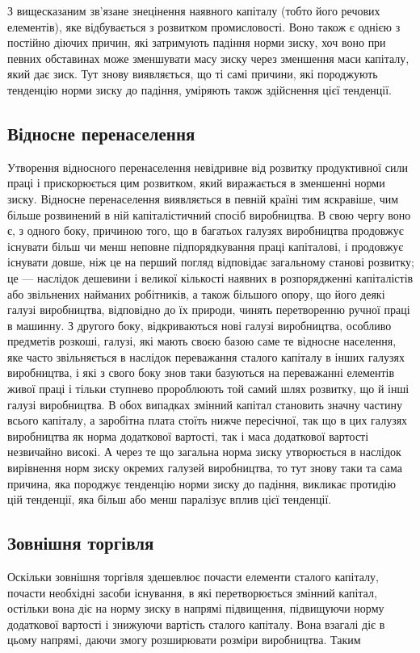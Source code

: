 
З вищесказаним зв’язане знецінення наявного капіталу (тобто його речових елементів), яке
відбувається з розвитком промисловості. Воно також є однією з постійно діючих причин, які затримують
падіння норми зиску, хоч воно при певних обставинах може зменшувати масу зиску через зменшення маси
капіталу, який дає зиск. Тут знову виявляється, що ті самі причини, які породжують тенденцію норми
зиску до падіння, уміряють також здійснення цієї тенденції.

\subsection{Відносне перенаселення}

Утворення відносного перенаселення невідривне від розвитку продуктивної сили праці і прискорюється
цим розвитком, який виражається в зменшенні норми зиску. Відносне перенаселення виявляється в певній
країні тим яскравіше, чим більше розвинений в ній капіталістичний спосіб виробництва. В свою чергу
воно є, з одного боку, причиною того, що в багатьох галузях виробництва продовжує існувати більш чи
менш неповне підпорядкування праці капіталові, і продовжує існувати довше, ніж це на перший погляд
відповідає загальному станові розвитку; це — наслідок дешевини і великої кількості наявних в
розпорядженні капіталістів або звільнених найманих робітників, а також більшого опору, що його деякі
галузі виробництва, відповідно до
їх природи, чинять перетворенню ручної праці в машинну. З другого боку, відкриваються нові галузі
виробництва, особливо предметів розкоші, галузі, які мають своєю базою саме те відносне населення,
яке часто звільняється в наслідок переважання сталого капіталу в інших галузях виробництва, і які з
свого боку знов таки базуються на переважанні елементів живої праці і тільки ступнево пророблюють
той самий шлях розвитку, що й інші галузі виробництва. В обох випадках змінний капітал становить
значну частину всього капіталу, а заробітна плата стоїть нижче пересічної, так що в цих галузях
виробництва як норма додаткової вартості, так і маса додаткової вартості незвичайно високі. А через
те що загальна норма зиску утворюється в наслідок вирівнення норм зиску окремих галузей виробництва,
то
тут знову таки та сама причина, яка породжує тенденцію норми зиску до падіння, викликає протидію цій
тенденції, яка більш або менш паралізує вплив цієї тенденції.

\subsection{Зовнішня торгівля}

Оскільки зовнішня торгівля здешевлює почасти елементи сталого капіталу, почасти необхідні засоби
існування, в які перетворюється змінний капітал, остільки вона діє на норму зиску в напрямі
підвищення, підвищуючи норму додаткової вартості і знижуючи вартість сталого капіталу. Вона взагалі
діє в цьому напрямі, даючи змогу розширювати розміри виробництва. Таким
\parbreak{}  %
